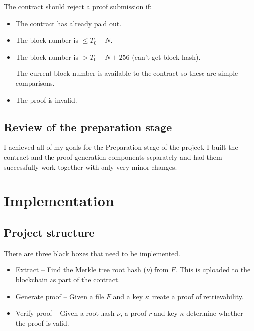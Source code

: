\documentclass[12pt,a4paper,twoside,openright]{report}
\begin{document}
The contract should reject a proof submission if:

\begin{itemize}
\item The contract has already paid out.


\item The block number is $\leq T_0 + N$.
\item The block number is $> T_0 + N + 256$ (can't get block hash).

The current block number is available to the contract so these are simple comparisons.

\item The proof is invalid.

\end{itemize}



\section{Review of the preparation stage}

I achieved all of my goals for the Preparation stage of the project.
I built the contract and the proof generation components separately and had them successfully work together with only very minor changes.


\chapter{Implementation}

\section{Project structure}


There are three black boxes that need to be implemented.
\begin{itemize}
\item Extract -- Find the Merkle tree root hash ($\nu$) from $F$. This is uploaded to the blockchain as part of the contract.
\item Generate proof -- Given a file $F$ and a key $\kappa$ create a proof of retrievability.
\item Verify proof -- Given a root hash $\nu$, a proof $r$ and key $\kappa$ determine whether the proof is valid.
\end{itemize}
\end{document}
